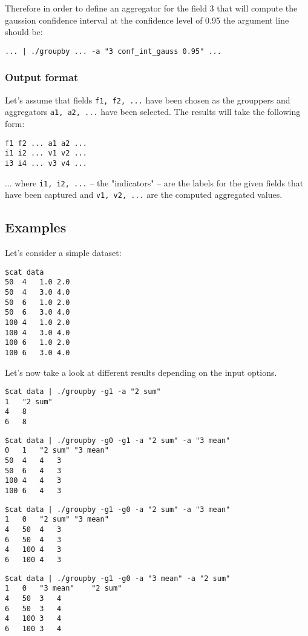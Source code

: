 \documentclass{report}
\begin{document}
Therefore in order to define an aggregator for the field 3 that will compute
the gaussion confidence interval at the confidence level of 0.95 the argument
line should be:

\texttt{... | ./groupby ... -a "3 conf\_int\_gauss 0.95" ...}

\subsubsection{Output format}
Let's assume that fields \texttt{f1, f2, ...} have been chosen as the
grouppers and aggregators \texttt{a1, a2, ...} have been selected.
The results will take the following form:
\begin{verbatim}
f1 f2 ... a1 a2 ...
i1 i2 ... v1 v2 ...
i3 i4 ... v3 v4 ...
\end{verbatim}

... where \texttt{i1, i2, ...} -- the "indicators" -- are the labels for
the given fields that have been captured and \texttt{v1, v2, ...} are
the computed aggregated values.

\subsection{Examples}
Let's consider a simple dataset:
\begin{verbatim}
$cat data
50	4	1.0	2.0
50	4	3.0	4.0
50	6	1.0	2.0
50	6	3.0	4.0
100	4	1.0	2.0
100	4	3.0	4.0
100	6	1.0	2.0
100	6	3.0	4.0
\end{verbatim}

Let's now take a look at different results depending on the input options.

\begin{verbatim}
$cat data | ./groupby -g1 -a "2 sum"
1	"2 sum"
4	8
6	8
\end{verbatim}

\begin{verbatim}
$cat data | ./groupby -g0 -g1 -a "2 sum" -a "3 mean"
0	1	"2 sum"	"3 mean"
50	4	4	3
50	6	4	3
100	4	4	3
100	6	4	3
\end{verbatim}

\begin{verbatim}
$cat data | ./groupby -g1 -g0 -a "2 sum" -a "3 mean"
1	0	"2 sum"	"3 mean"
4	50	4	3
6	50	4	3
4	100	4	3
6	100	4	3
\end{verbatim}

\begin{verbatim}
$cat data | ./groupby -g1 -g0 -a "3 mean" -a "2 sum"
1	0	"3 mean"	"2 sum"
4	50	3	4
6	50	3	4
4	100	3	4
6	100	3	4
\end{verbatim}
\end{document}
